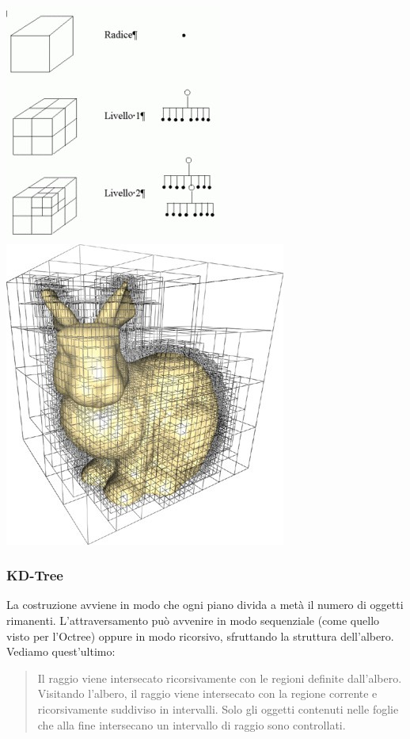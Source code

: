 \documentclass[a4paper, 10pt]{article}
\begin{document}
	\begin{center}
		\includegraphics[scale=0.5]{octree3}
		\hspace{1cm}
		\includegraphics[scale=0.5]{octree2}
	\end{center}

	\subsubsection{KD-Tree}
	La costruzione avviene in modo che ogni piano divida a metà il numero di oggetti rimanenti. L’attraversamento può avvenire in modo sequenziale (come quello visto per l’Octree) oppure in modo ricorsivo, sfruttando la struttura dell’albero. Vediamo quest’ultimo:
	\begin{quote}
		Il raggio viene intersecato ricorsivamente con le regioni definite
		dall'albero. Visitando l’albero, il raggio viene intersecato con la
		regione corrente e ricorsivamente suddiviso in intervalli. Solo gli
		oggetti contenuti nelle foglie che alla fine intersecano un
		intervallo di raggio sono controllati.
	\end{quote}
	
\end{document}
